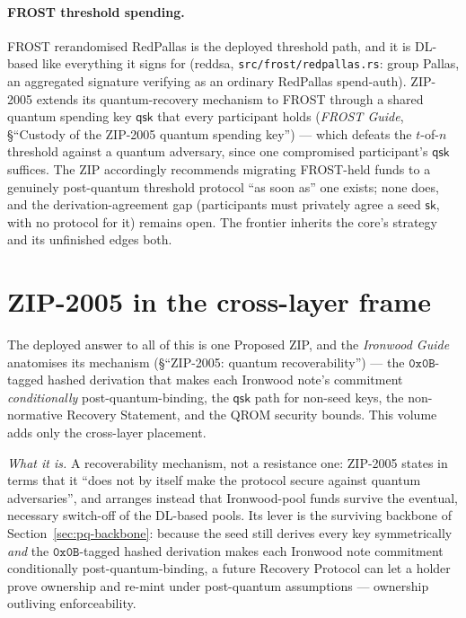\documentclass[11pt,a4paper]{article}
\theoremstyle{definition}
\begin{document}
\paragraph{FROST threshold spending.} FROST rerandomised RedPallas is
the deployed threshold path, and it is DL-based like everything it
signs for (\textsf{reddsa}, \texttt{src/frost/redpallas.rs}: group
Pallas, an aggregated signature verifying as an ordinary RedPallas
spend-auth). ZIP-2005 extends its quantum-recovery mechanism to FROST
through a shared quantum spending key $\mathsf{qsk}$ that every
participant holds (\emph{FROST Guide}, \S``Custody of the ZIP-2005
quantum spending key'') --- which defeats the $t$-of-$n$ threshold
against a quantum adversary, since one compromised participant's
$\mathsf{qsk}$ suffices. The ZIP accordingly recommends migrating
FROST-held funds to a genuinely post-quantum threshold protocol ``as
soon as'' one exists; none does, and the derivation-agreement gap
(participants must privately agree a seed $\mathsf{sk}$, with no
protocol for it) remains open. The frontier inherits the core's
strategy and its unfinished edges both.

\section{ZIP-2005 in the cross-layer frame}\label{sec:pq-2005}

The deployed answer to all of this is one Proposed ZIP, and the
\emph{Ironwood Guide} anatomises its mechanism (\S``ZIP-2005: quantum
recoverability'') --- the $\mathtt{0x0B}$-tagged
hashed derivation that makes each Ironwood note's commitment
\emph{conditionally} post-quantum-binding, the $\mathsf{qsk}$ path for
non-seed keys, the non-normative Recovery Statement, and the QROM
security bounds. This volume adds only the cross-layer placement.

\emph{What it is.} A recoverability mechanism, not a resistance one:
ZIP-2005 states in terms that it ``does not by itself make the protocol
secure against quantum adversaries'', and arranges instead that
Ironwood-pool funds survive the eventual, necessary switch-off of the
DL-based pools. Its lever is the surviving backbone of
Section~\ref{sec:pq-backbone}: because the seed still derives every key
symmetrically \emph{and} the $\mathtt{0x0B}$-tagged hashed derivation
makes each Ironwood note commitment conditionally post-quantum-binding,
a future Recovery Protocol can let a holder prove ownership and re-mint
under post-quantum assumptions --- ownership outliving enforceability.
\end{document}

